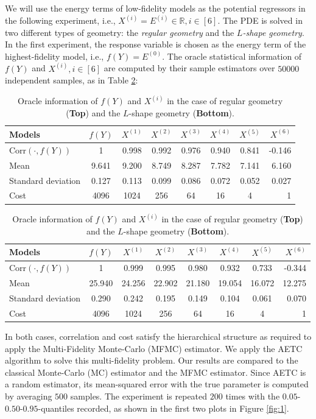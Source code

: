 \documentclass[a4paper,11pt]{article}
\numberwithin{equation}{section}
\theoremstyle{plain}
\theoremstyle{definition}
\def\R{{\mathbb R}}
\def\R{{\mathbb R}}
\begin{document}
We will use the energy terms of low-fidelity models as the potential regressors in the following experiment, i.e., $X^{(i)} = E^{(i)}\in\R, i\in [6]$. 
The PDE is solved in two different types of geometry: the \emph{regular geometry} and the \emph{$L$-shape geometry}. 
In the first experiment, the response variable is chosen as the energy term of the highest-fidelity model, i.e., $f(Y) = E^{(0)}$. 
The oracle statistical information of $f(Y)$ and $X^{(i)}, i\in [6]$ are computed by their sample estimators over $50000$ independent samples, as in Table \ref{145}:

\medskip
\begin{table}[h!]
\begin{center}
\small
\begin{tabular}{l*{6}{c}r}
Models              & $f(Y)$ &$X^{(1)}$ & $X^{(2)}$ & $X^{(3)}$ & $X^{(4)}$& $X^{(5)}$  & $X^{(6)}$ \\
\hline
$\text{Corr}(\cdot, f(Y))$ & 1 & 0.998 & 0.992 & 0.976 & 0.940 & 0.841 & -0.146\\
Mean            & 9.641 & 9.200 & 8.749 & 8.287 &  7.782 & 7.141 & 6.160\\
Standard deviation            & 0.127 & 0.113 & 0.099 & 0.086 &  0.072 & 0.052 & 0.027\\
Cost            & 4096& 1024 & 256 & 64 & 16 &  4 & 1 \\
\end{tabular} 
\bigskip
\bigskip

\begin{tabular}{l*{6}{c}r}
Models              & $f(Y)$ &$X^{(1)}$ & $X^{(2)}$ & $X^{(3)}$ & $X^{(4)}$& $X^{(5)}$  & $X^{(6)}$ \\
\hline
$\text{Corr}(\cdot, f(Y))$ & 1 & 0.999 & 0.995 & 0.980 & 0.932 & 0.733 & -0.344\\
Mean            & 25.940 & 24.256 & 22.902 & 21.180 &  19.054 & 16.072 & 12.275\\
Standard deviation            & 0.290 & 0.242 & 0.195 & 0.149 &  0.104 & 0.061 & 0.070\\
Cost            & 4096& 1024 & 256 & 64 & 16 &  4 & 1 \\
\end{tabular} 
\caption{\small Oracle information of $f(Y)$ and $X^{(i)}$ in the case of regular geometry (\textbf{Top}) and the $L$-shape geometry (\textbf{Bottom}).}\label{145}
\end{center}
\end{table}
In both cases, correlation and cost satisfy the hierarchical structure as required to apply the Multi-Fidelity Monte-Carlo (MFMC) estimator.
We apply the AETC algorithm to solve this multi-fidelity problem. 
Our results are compared to the classical Monte-Carlo (MC) estimator and the MFMC estimator. 
Since AETC is a random estimator, its mean-squared error with the true parameter is computed by averaging $500$ samples. 
The experiment is repeated $200$ times with the $0.05$-$0.50$-$0.95$-quantiles recorded, as shown in the first two plots in Figure \ref{fig:1}.  
\end{document}
